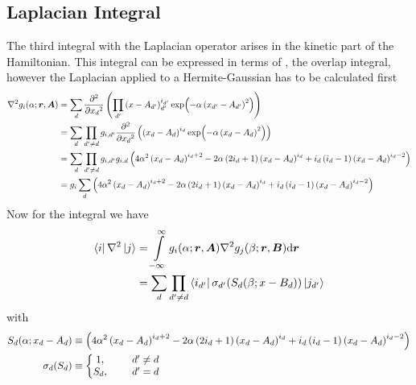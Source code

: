 \subsection{Laplacian Integral}
    The third integral with the Laplacian operator arises in the kinetic part
    of the Hamiltonian. This integral can be expressed in terms of
    , the overlap integral, however the Laplacian applied
    to a Hermite-Gaussian has to be calculated first
        \begin{align}
            \nabla^2 g_i(\alpha;\blds{r},\blds{A}) &= \sum_d \prd{x_d}[][2]
            \left(\prod_{d'} \left(x - A_{d'}\right)^{i_{d'}}_{d'} \exp(-\alpha
            \left(x_{d'} - A_{d'}\right)^2)\right)\nonumber \\
            &= \sum_d \prod_{d'\neq d} g_{i,d'} \prd{x_d}[][2]\left(\left(x_d -
            A_d\right)^{i_d} \exp(-\alpha \left(x_d - A_d\right)^2)\right)
            \nonumber \\
            &= \sum_d \prod_{d'\neq d} g_{i,d'} g_{i,d}
            \left(4\alpha^2\left(x_d-A_d\right)^{i_d+2} -
            2\alpha\left(2i_d+1\right)\left(x_d-A_d\right)^{i_d} +
            i_d\left(i_d-1\right)\left(x_d-A_d\right)^{i_d-2}\right) \nonumber
            \\
            &= g_i\sum_d \left(4\alpha^2\left(x_d-A_d\right)^{i_d+2} -
            2\alpha\left(2i_d+1\right)\left(x_d-A_d\right)^{i_d} +
            i_d\left(i_d-1\right)\left(x_d-A_d\right)^{i_d-2}\right)
        \end{align}
    Now for the integral we have
        \begin{align}
            \bra{i}\nabla^2\ket{j} &= \int\limits^{\infty}_{-\infty}
            g_i(\alpha;\boldsymbol{{r}},\boldsymbol{{A}})\nabla^2g_j(\beta;\boldsymbol{{r}},\boldsymbol{{B}}) 
            \mathrm{d}\boldsymbol{{r}} \nonumber \\
            &= \sum_d\prod_{d'\neq d}
            \bra{i_{d'}}\sigma_{d'}(S_d(\beta;x-B_d))\ket{j_{d'}}
            \label{eq:laplacianIntegral}
        \end{align}
    with
        \begin{equation}
            \begin{aligned}
                S_d(\alpha;x_d-A_d) &\equiv
                \left(4\alpha^2\left(x_d-A_d\right)^{i_d+2} -
                2\alpha\left(2i_d+1\right)\left(x_d-A_d\right)^{i_d} +
                i_d\left(i_d-1\right)\left(x_d-A_d\right)^{i_d-2}\right) \\
                \sigma_d(S_d) &\equiv \left\{\begin{matrix}
                                            1,&\indent d' \neq d \\
                                            S_d,&\indent d' = d
                                            \end{matrix}
                                        \right.
            \end{aligned}
        \end{equation}
